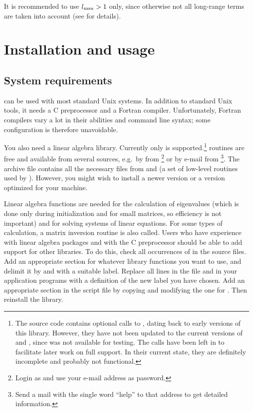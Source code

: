 It is recommended to use $l_{\rm max} > 1$ only, since otherwise not
all long-range terms are taken into account (see \cite{cifehiwabl} for
details).


\section{Installation and usage}

\subsection{System requirements}

 can be used with most standard Unix systems.
In addition to standard Unix tools, it needs a C preprocessor and a
Fortran compiler. Unfortunately, Fortran compilers vary a lot in their
abilities and command line syntax; some configuration is therefore
unavoidable.

You also need a linear algebra library. Currently only 
is supported.\footnote{The source code contains optional calls to
, dating back to early versions of this library.  However,
they have not been updated to the current versions of
 and , since  was not
available for testing. The calls have been left in to facilitate later
work on full  support. In their current state, they are
definitely incomplete and probably not functional.} 
routines are free and available from several sources, e.g.\ by
 from \footnote{Login as
 and use your e-mail address as password.} or by e-mail
from \footnote{Send a mail with the single word
``help'' to that address to get detailed information.}. The 
archive file contains all the necessary files from  and
 (a set of low-level routines used by ).
However, you might wish to install a newer version or a version optimized
for your machine.

Linear algebra functions are needed for the calculation of eigenvalues
(which is done only during initialization and for small matrices, so
efficiency is not important) and for solving systems of linear
equations. For some types of calculation, a matrix inversion routine
is also called. Users who have experience with linear algebra packages
and with the C preprocessor should be able to add support for other
libraries. To do this, check all occurrences of
 in the source files. Add an appropriate
section for whatever library functions you want to use, and delimit it
by  and  with a suitable label. Replace
all  lines in the file  and in
your application programs with a definition of the new label you have
chosen. Add an appropriate section in the script file 
by copying and modifying the one for . Then reinstall the
library.

